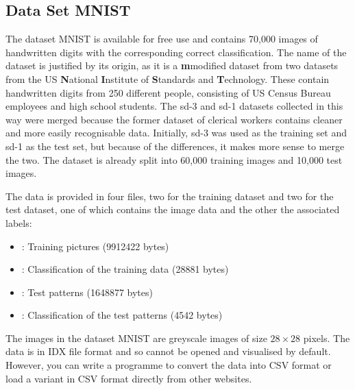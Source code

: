 %
%


\subsection{Data Set MNIST}

The dataset MNIST is available for free use and contains 70,000 images of handwritten digits with the corresponding correct classification. \cite{Deng:2009,Deng:2012} The name of the dataset is justified by its origin, as it is a \textbf{m}modified dataset from two datasets from the US \textbf{N}ational \textbf{I}nstitute of \textbf{S}tandards and \textbf{T}echnology. These contain handwritten digits from 250 different people, consisting of US Census Bureau employees and high school students. The \ac{sd-3} and \ac{sd-1} datasets collected in this way were merged because the former dataset of clerical workers contains cleaner and more easily recognisable data. Initially, \ac{sd-3} was used as the training set and \ac{sd-1} as the test set, but because of the differences, it makes more sense to merge the two. The dataset is already split into 60,000 training images and 10,000 test images. \cite{LeCun:2013,Nielsen:2015}

The data is provided in four files, two for the training dataset and two for the test dataset, one of which contains the image data and the other the associated labels:


\begin{itemize}
    \item {}:  Training pictures (9912422 bytes)
    \item {}:  Classification of the training data (28881 bytes)
    \item {}:  Test patterns (1648877 bytes)
    \item {}:  Classification of the test patterns (4542 bytes)
\end{itemize}


The images in the dataset MNIST are greyscale images of size $28 \times 28$ pixels.\cite{LeCun:2013} The data is in IDX file format and so cannot be opened and visualised by default. However, you can write a programme to convert the data into CSV format or load a variant in CSV format directly from other websites. \cite{Redmon:2020}


